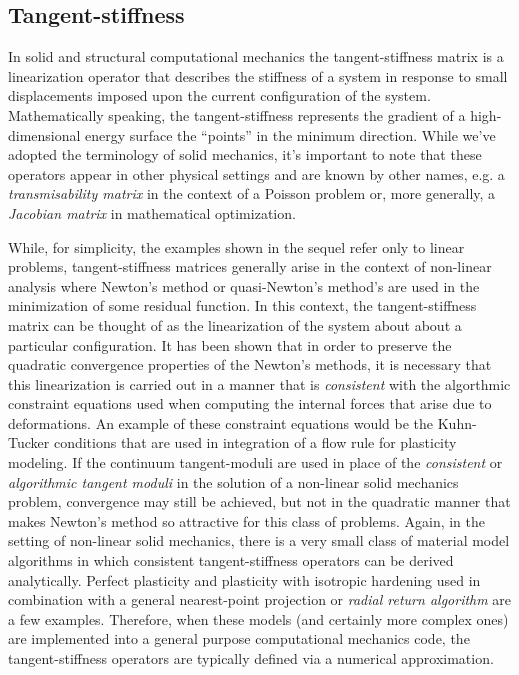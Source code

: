\documentclass[preprint,12pt]{elsarticle}
\begin{document}
\subsection{Tangent-stiffness} 

In solid and structural computational mechanics the tangent-stiffness matrix is a linearization operator that describes the stiffness of a system in response to small displacements imposed upon the current configuration of the system.  Mathematically speaking, the tangent-stiffness represents the gradient of a high-dimensional energy surface the ``points'' in the minimum direction. While we've adopted the terminology of solid mechanics, it's important to note that these operators appear in other physical settings and are known by other names, e.g. a \emph{transmisability matrix} in the context of a Poisson problem or, more generally, a \emph{Jacobian matrix} in mathematical optimization.

While, for simplicity, the examples shown in the sequel refer only to linear problems, tangent-stiffness matrices generally arise in the context of non-linear analysis where Newton's method or quasi-Newton's method's are used in the minimization of some residual function.  In this context, the tangent-stiffness matrix can be thought of as the linearization of the system about about a particular configuration.  It has been shown \cite{hughes1978consistent, hughes1978unconditionally} that in order to preserve the quadratic convergence properties of the Newton's methods, it is necessary that this linearization is carried out in a manner that is \emph{consistent} with the algorthmic constraint equations used when computing the internal forces that arise due to deformations.  An example of these constraint equations would be the Kuhn-Tucker conditions \cite{simo1998} that are used in integration of a flow rule for plasticity modeling.  If the continuum tangent-moduli are used in place of the \emph{consistent} or \emph{algorithmic tangent moduli} in the solution of a non-linear solid mechanics problem, convergence may still be achieved, but not in the quadratic manner that makes Newton's method so attractive for this class of problems.  Again, in the setting of non-linear solid mechanics, there is a very small class of material model algorithms in which consistent tangent-stiffness operators can be derived analytically.  Perfect plasticity and plasticity with isotropic hardening used in combination with a general nearest-point projection or \emph{radial return algorithm} are a few examples.  Therefore, when these models (and certainly more complex ones) are implemented into a general purpose computational mechanics code, the tangent-stiffness operators are typically defined via a numerical approximation.
\end{document}
